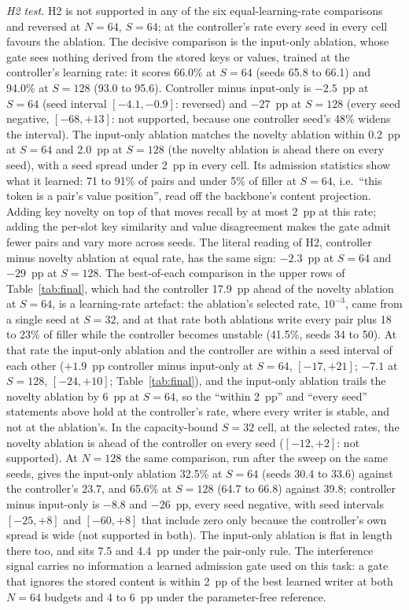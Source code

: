 \documentclass[conference]{IEEEtran}
\begin{document}
\textit{H2 test.} H2 is not supported in any of the six equal-learning-rate
comparisons and reversed at $N = 64$, $S = 64$; at the controller's rate every
seed in every cell favours the ablation. The decisive comparison is the input-only ablation, whose gate
sees nothing derived from the stored keys or values, trained at the
controller's learning rate: it scores 66.0\% at $S = 64$ (seeds 65.8 to 66.1)
and 94.0\% at $S = 128$ (93.0 to 95.6). Controller minus input-only is
$-2.5$~pp at $S = 64$ (seed interval $[-4.1, -0.9]$: reversed) and $-27$~pp at
$S = 128$ (every seed negative, $[-68, +13]$: not supported, because one
controller seed's 48\% widens the interval). The input-only ablation matches
the novelty ablation within 0.2~pp at $S = 64$ and 2.0~pp at $S = 128$ (the
novelty ablation is ahead there on every seed), with a seed spread under
2~pp in every cell. Its admission statistics show what it learned:
71 to 91\% of pairs and under 5\% of filler at $S = 64$, i.e.\ ``this token is
a pair's value position'', read off the backbone's content projection. Adding
key novelty on top of that moves recall by at most 2~pp at this rate; adding the per-slot
key similarity and value disagreement makes the gate admit fewer pairs and vary
more across seeds. The literal reading of H2, controller minus novelty
ablation at equal rate, has the same sign: $-2.3$~pp at $S = 64$ and $-29$~pp at
$S = 128$. The best-of-each comparison in the upper rows of
Table~\ref{tab:final}, which had the controller 17.9~pp ahead of the novelty
ablation at $S = 64$, is a learning-rate artefact: the ablation's selected rate,
$10^{-3}$, came from a single seed at $S = 32$, and at that rate both
ablations write every pair plus 18 to 23\% of filler while the controller
becomes unstable (41.5\%, seeds 34 to 50). At that rate the input-only
ablation and the controller are within a seed interval of each other
($+1.9$~pp controller minus input-only at $S = 64$, $[-17, +21]$; $-7.1$ at
$S = 128$, $[-24, +10]$; Table~\ref{tab:final}), and the input-only ablation
trails the novelty ablation by 6~pp at $S = 64$, so the ``within 2~pp'' and
``every seed'' statements above hold at the controller's rate, where every
writer is stable, and not at the ablation's. In the capacity-bound
$S = 32$ cell, at the selected rates, the novelty ablation is ahead of the
controller on every seed ($[-12, +2]$: not supported). At $N = 128$ the same
comparison, run after the sweep on the same seeds, gives the input-only
ablation 32.5\% at $S = 64$ (seeds 30.4 to 33.6) against the controller's
23.7, and 65.6\% at $S = 128$ (64.7 to 66.8) against 39.8; controller minus
input-only is $-8.8$ and $-26$~pp, every seed negative, with seed intervals
$[-25, +8]$ and $[-60, +8]$ that include zero only because the controller's
own spread is wide (not supported in both). The input-only ablation is flat in
length there too, and sits 7.5 and 4.4~pp under the pair-only rule. The interference signal carries no information a
learned admission gate used on this task: a gate that ignores the stored
content is within 2~pp of the best learned writer at both $N = 64$ budgets and
4 to 6~pp under the parameter-free reference.
\end{document}
